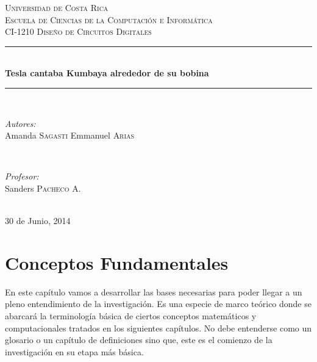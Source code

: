 \documentclass[11pt,a4paper]{article}
\begin{document}
\begin{titlepage}

\newcommand{\HRule}{\rule{\linewidth}{0.5mm}} 

\center

\textsc{\LARGE Universidad de Costa Rica}\\[1.5cm]
\textsc{\Large Escuela de Ciencias de la Computación e Informática}\\[0.5cm] 
\textsc{\large CI-1210 Diseño de Circuitos Digitales}\\[0.5cm] 

\HRule \\[0.4cm]
{ \huge \bfseries Tesla cantaba Kumbaya alrededor de su bobina}\\[0.4cm] %
\HRule \\[1.5cm]

\begin{minipage}{0.4\textwidth}
\begin{flushleft} \large
\emph{Autores:}\\
Amanda \textsc{Sagasti}
Emmanuel \textsc{Arias} 
\end{flushleft}
\end{minipage}
~
\begin{minipage}{0.4\textwidth}
\begin{flushright} \large
\emph{Profesor:} \\
Sanders \textsc{Pacheco A.} %
\end{flushright}
\end{minipage}\\[4cm]

{\large 30 de Junio, 2014}\\[3cm] 

\vfill 

\end{titlepage}

\tableofcontents 
\clearpage


\part{Conceptos Fundamentales}
En este capítulo vamos a desarrollar las bases necesarias para poder llegar a un pleno entendimiento de la investigación. Es una especie de marco teórico donde se abarcará la terminología básica de ciertos conceptos matemáticos y computacionales tratados en los siguientes capítulos. No debe entenderse como un glosario o un capítulo de definiciones sino que, este es el comienzo de la investigación en su etapa más básica.
\end{document}
